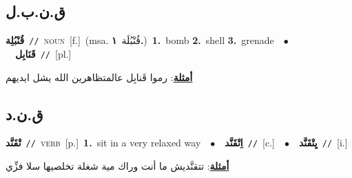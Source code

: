 \documentclass[10pt,a4paper,twoside]{article} %
\begin{document}
\begin{multicols}{2}
\vspace{-3mm}
\subsection*{\color{blue}\foreignlanguage{arabic}{ق.ن.ب.ل}\color{blue}{}} 

{\setlength\topsep{0pt}\textbf{\foreignlanguage{arabic}{قُنْبُلِة}}\ {\color{gray}\texttt{//}\color{black}}\ \textsc{noun}\ [f.]\ \color{gray}(msa. \foreignlanguage{arabic}{قُنْبُلَة}~\foreignlanguage{arabic}{\textbf{١.}})\color{black}\ \textbf{1.}~bomb  \textbf{2.}~shell  \textbf{3.}~grenade\ \ $\bullet$\ \ \setlength\topsep{0pt}\textbf{\foreignlanguage{arabic}{قَنَابِل}}\ {\color{gray}\texttt{//}\color{black}}\ [pl.]\  \begin{flushright}\color{gray}\foreignlanguage{arabic}{\textbf{\underline{\foreignlanguage{arabic}{أمثلة}}}: رموا قَنابِل عالمتظاهرين الله يشل ايديهم}\end{flushright}\color{black}} \vspace{2mm}

\vspace{-3mm}
\subsection*{\color{blue}\foreignlanguage{arabic}{ق.ن.د}\color{blue}{}} 

{\setlength\topsep{0pt}\textbf{\foreignlanguage{arabic}{تْقَنَّد}}\ {\color{gray}\texttt{//}\color{black}}\ \textsc{verb}\ [p.]\ \textbf{1.}~sit in a very  relaxed way\ \ $\bullet$\ \ \setlength\topsep{0pt}\textbf{\foreignlanguage{arabic}{اِتْقَنَّد}}\ {\color{gray}\texttt{//}\color{black}}\ [c.]\ \ $\bullet$\ \ \setlength\topsep{0pt}\textbf{\foreignlanguage{arabic}{يِتْقَنَّد}}\ {\color{gray}\texttt{//}\color{black}}\ [i.]\  \begin{flushright}\color{gray}\foreignlanguage{arabic}{\textbf{\underline{\foreignlanguage{arabic}{أمثلة}}}: تتقنَّديش ما أنت وراك مية شغلة تخلصيها سلا فزِّي}\end{flushright}\color{black}} \vspace{2mm}


\end{multicols}
\end{document}
